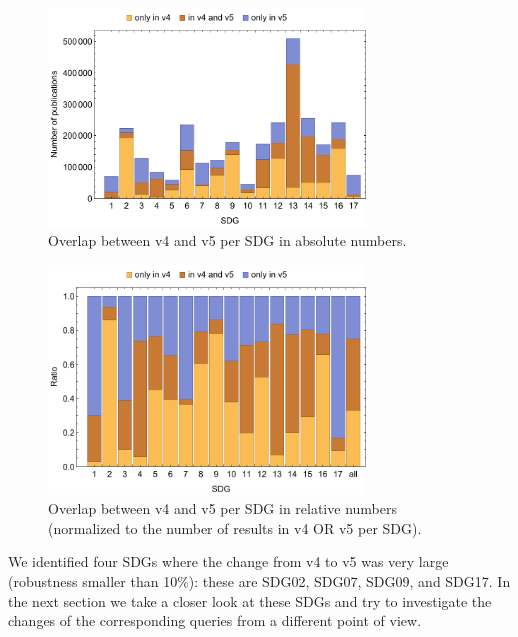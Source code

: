 \documentclass{article}
\begin{document}
\begin{figure}[H]
	\centering
  \includegraphics[width=0.75\textwidth]{figures/overlapv4vsv5barchartabsolute.pdf}
	\caption{Overlap between v4 and v5 per SDG in absolute numbers.}
	\label{overlapv4vsv5absolute}
\end{figure}
\begin{figure}[H]
	\centering
  \includegraphics[width=0.75\textwidth]{figures/overlapv4vsv5barchartrelative.pdf}
	\caption{Overlap between v4 and v5 per SDG in relative numbers (normalized to the number of results in v4 OR v5 per SDG).}
	\label{overlapv4vsv5relative}
\end{figure}
We identified four SDGs where the change from v4 to v5 was very large (robustness smaller than 10\%): these are SDG02, SDG07, SDG09, and SDG17. In the next section we take a closer look at these SDGs and try to investigate the changes of the corresponding queries from a different point of view.
\end{document}
